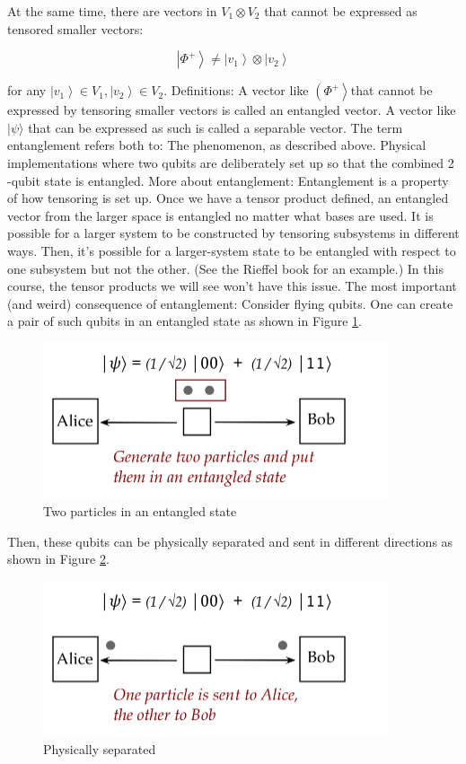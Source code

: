 \documentclass[main.tex]{subfiles}
\begin{document}
    At the same time, there are vectors in $V_{1} \otimes V_{2}$ that cannot be expressed as tensored smaller vectors:
    
    $$
    \left|\Phi^{+}\right\rangle \neq\left|v_{1}\right\rangle \otimes\left|v_{2}\right\rangle
    $$
    
    for any $\left|v_{1}\right\rangle \in V_{1},\left|v_{2}\right\rangle \in V_{2}$. Definitions: A vector like $\left(\Phi^{+}\right\rangle$that cannot be expressed by tensoring smaller vectors is called an entangled vector. A vector like $|\psi\rangle$ that can be expressed as such is called a separable vector. The term entanglement refers both to: The phenomenon, as described above. Physical implementations where two qubits are deliberately set up so that the combined 2 -qubit state is entangled. More about entanglement: Entanglement is a property of how tensoring is set up. Once we have a tensor product defined, an entangled vector from the larger space is entangled no matter what bases are used. It is possible for a larger system to be constructed by tensoring subsystems in different ways. Then, it's possible for a larger-system state to be entangled with respect to one subsystem but not the other. (See the Rieffel book for an example.) In this course, the tensor products we will see won't have this issue. The most important (and weird) consequence of entanglement: Consider flying qubits. One can create a pair of such qubits in an entangled state as shown in Figure \ref{fig:08entangle1}.
    
    \begin{figure}
        \centering
        \includegraphics[width=4in]{notes/figs/n06/08entangle1.png}
        \caption{Two particles in an entangled state}
        \label{fig:08entangle1}
    \end{figure}
    
    Then, these qubits can be physically separated and sent in different directions as shown in Figure \ref{fig:09entangle2}.
    
    \begin{figure}
        \centering
        \includegraphics[width=4in]{notes/figs/n06/09entangle2.png}
        \caption{Physically separated}
        \label{fig:09entangle2}
    \end{figure}
    
\end{document}

